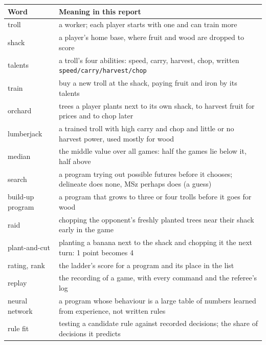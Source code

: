 \documentclass[10pt,a4paper]{article}
\begin{document}
\begin{tabularx}{\textwidth}{@{}l Y@{}}
\toprule
\textbf{Word} & \textbf{Meaning in this report} \\
\midrule
troll & a worker; each player starts with one and can train more \\
shack & a player's home base, where fruit and wood are dropped to score \\
talents & a troll's four abilities: speed, carry, harvest, chop, written \texttt{speed/carry/harvest/chop} \\
train & buy a new troll at the shack, paying fruit and iron by its talents \\
orchard & trees a player plants next to its own shack, to harvest fruit for prices and to chop later \\
lumberjack & a trained troll with high carry and chop and little or no harvest power, used mostly for wood \\
median & the middle value over all games: half the games lie below it, half above \\
search & a program trying out possible futures before it chooses; delineate does none, MSz perhaps does (a guess) \\
build-up program & a program that grows to three or four trolls before it goes for wood \\
raid & chopping the opponent's freshly planted trees near their shack early in the game \\
plant-and-cut & planting a banana next to the shack and chopping it the next turn: 1 point becomes 4 \\
rating, rank & the ladder's score for a program and its place in the list \\
replay & the recording of a game, with every command and the referee's log \\
neural network & a program whose behaviour is a large table of numbers learned from experience, not written rules \\
rule fit & testing a candidate rule against recorded decisions; the share of decisions it predicts \\
\bottomrule
\end{tabularx}
\end{document}
